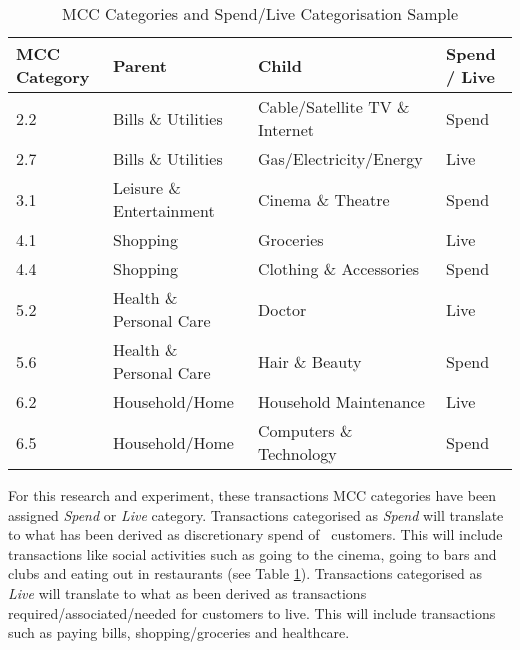 \begin{table}[H]
	\centering
	\resizebox{\textwidth}{!}
	{
		\label{my-label}
		\begin{tabular}{|l|l|l|l|}
			\hline
			\textbf{MCC Category} & \textbf{Parent}          & \textbf{Child}                 & \textbf{Spend / Live} \\ \hline
			2.2                   & Bills \& Utilities       & Cable/Satellite TV \& Internet & Spend                 \\ \hline
			2.7                   & Bills \& Utilities       & Gas/Electricity/Energy         & Live                  \\ \hline
			3.1                   & Leisure \& Entertainment & Cinema \& Theatre              & Spend                 \\ \hline
			4.1                   & Shopping                 & Groceries                     & Live                  \\ \hline
			4.4                   & Shopping                 & Clothing \& Accessories        & Spend                 \\ \hline
			5.2                   & Health \& Personal Care  & Doctor                         & Live                  \\ \hline
			5.6                   & Health \& Personal Care  & Hair \& Beauty                 & Spend                 \\ \hline
			6.2                   & Household/Home           & Household Maintenance          & Live                  \\ \hline
			6.5                   & Household/Home           & Computers \& Technology        & Spend                 \\ \hline
		\end{tabular}
	}
	\caption{MCC Categories and Spend/Live Categorisation Sample}
	\label{table:mcc}
\end{table}

For this research and experiment, these transactions MCC categories have been assigned \textit{Spend} or \textit{Live} category. Transactions categorised as \textit{Spend} will translate to what has been derived as discretionary spend of \subjectname\ customers. This will include transactions like social activities such as going to the cinema, going to bars and clubs and eating out in restaurants (see Table \ref{table:mcc}). Transactions categorised as \textit{Live} will translate to what as been derived as transactions required/associated/needed for customers to live. This will include transactions such as paying bills, shopping/groceries and healthcare.

